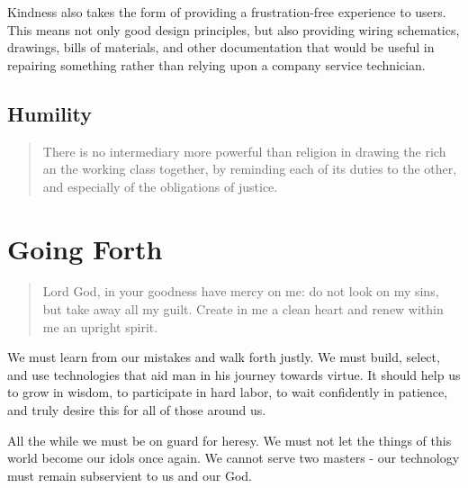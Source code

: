\documentclass[letterpaper]{article}
\begin{document}
Kindness also takes the form of providing a frustration-free experience to users. This means not only good design principles, but also providing wiring schematics, drawings, bills of materials, and other documentation that would be useful in repairing something rather than relying upon a company service technician.

\subsection{Humility}

\begin{quote}
  There is no intermediary more powerful than religion in drawing the rich an the working class together, by reminding each of its duties to the other, and especially of the obligations of justice.
\end{quote}

\hfill

\hfill

\hfill

\hfill

\hfill

\hfill

\hfill

\hfill

\hfill

\section{Going Forth}

\begin{quote}
  Lord God, in your goodness have mercy on me: do not look on my sins, but take away all my guilt. Create in me a clean heart and renew within me an upright spirit.
\end{quote}

We must learn from our mistakes and walk forth justly. We must build, select, and use technologies that aid man in his journey towards virtue. It should help us to grow in wisdom, to participate in hard labor, to wait confidently in patience, and truly desire this for all of those around us.

All the while we must be on guard for heresy. We must not let the things of this world become our idols once again. We cannot serve two masters - our technology must remain subservient to us and our God.
\end{document}
